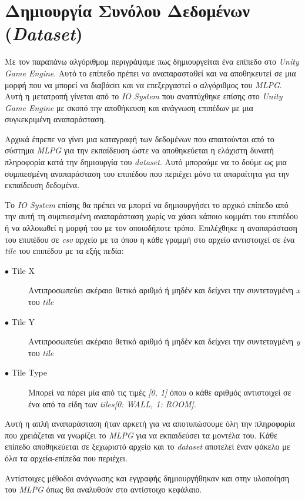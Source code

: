 \section{Δημιουργία Συνόλου Δεδομένων (\textit{Dataset})}
Με τον παραπάνω αλγόριθμομ περιγράψαμε πως δημιουργείται ένα επίπεδο στο \textit{Unity Game Engine}. Αυτό το επίπεδο πρέπει να αναπαρασταθεί και να αποθηκευτεί σε μια μορφή που να μπορεί να διαβάσει και να επεξεργαστεί ο αλγόριθμος του \textit{MLPG}. Αυτή η μετατροπή γίνεται από το \textit{IO System} που αναπτύχθηκε επίσης στο \textit{Unity Game Engine} με σκοπό την αποθήκευση και ανάγνωση επιπέδων με μια συγκεκριμένη αναπαράσταση.
\par
Αρχικά έπρεπε να γίνει μια καταγραφή των δεδομένων που απαιτούνται από το σύστημα \textit{MLPG} για την εκπαίδευση ώστε να αποθηκεύεται η ελάχιστη δυνατή πληροφορία κατά την δημιουργία του \textit{dataset}. Αυτό μπορούμε να το δούμε ως μια συμπιεσμένη αναπαράσταση του επιπέδου που περιέχει μόνο τα απαραίτητα για την εκπαίδευση δεδομένα.
\par
Το \textit{IO System} επίσης θα πρέπει να μπορεί να δημιουργήσει το αρχικό επίπεδο από την αυτή τη συμπιεσμένη αναπαράσταση χωρίς να χάσει κάποιο κομμάτι του επιπέδου ή να αλλοιωθεί η μορφή του με τον οποιοδήποτε τρόπο. Επιλέχθηκε η αναπαράσταση του επιπέδου σε \textit{csv} αρχείο με τα όπου η κάθε γραμμή στο αρχείο αντιστοιχεί σε ένα \textit{tile} του επιπέδου με τα εξής πεδία:

\begin{description}
\item[$\bullet$ Tile X] Αντιπροσωπεύει ακέραιο θετικό αριθμό ή μηδέν και δείχνει την συντεταγμένη \textit{x} του \textit{tile}
\item[$\bullet$ Tile Y] Αντιπροσωπεύει ακέραιο θετικό αριθμό ή μηδέν και δείχνει την συντεταγμένη \textit{y} του \textit{tile}
\item[$\bullet$ Tile Type] Μπορεί να πάρει μία από τις τιμές \textit{[0, 1]} όπου ο κάθε αριθμός αντιστοιχεί σε ένα από τα είδη των \textit{tiles}\textit{[0: WALL, 1: ROOM]}.
\end{description}

Αυτή η απλή αναπαράσταση ήταν αρκετή για να αποτυπώσουμε όλη την πληροφορία που χρειάζεται να γνωρίζει το \textit{MLPG} για να εκπαιδεύσει τα μοντέλα του. Κάθε επίπεδο αποθηκεύεται σε ξεχωριστό αρχείο και το \textit{dataset} αποτελεί έναν φάκελο με όλα τα αρχεία-επίπεδα που περιέχει.
\par
Αντίστοιχες μέθοδοι ανάγνωσης και εγγραφής δημιουργήθηκαν και στην υλοποίηση του \textit{MLPG} όπως θα αναλυθούν στο αντίστοιχο κεφάλαιο.

